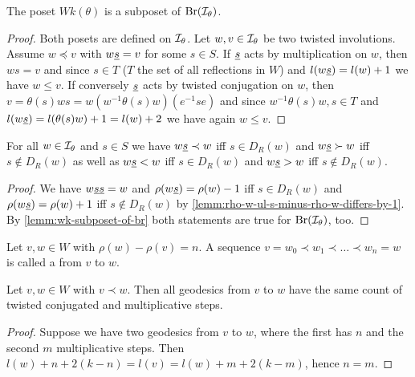 \begin{lemm}
	The poset $Wk(\theta)$ is a subposet of $\operatorname{Br}(\mathcal{I}_{\theta})$.

	\begin{proof}
		Both posets are defined on $\mathcal{I}_{\theta}$. Let $w,v \in \mathcal{I}_{\theta}$ be two twisted involutions. Assume $w \preceq v$ with $w \underline{s} = v$ for some $s \in S$. If $\underline{s}$ acts by multiplication on $w$, then $ws = v$ and since $s \in T$ ($T$ the set of all reflections in $W$) and $l(w \underline{s}) = l(w) + 1$ we have $w \leq v$. If conversely $\underline{s}$ acts by twisted conjugation on $w$, then $v = \theta(s)ws = w (w^{-1} \theta(s) w)(e^{-1}se)$ and since $w^{-1} \theta(s) w, s \in T$ and $l(w \underline{s}) = l(\theta(s)w) + 1 = l(w) + 2$ we have again $w \leq v$.
	\end{proof}
\end{lemm}

\begin{prop}
	For all $w \in \mathcal{I}_{\theta}$ and $s \in S$ we have $w \underline{s} \prec w$ iff $s \in D_R(w)$ and $w \underline{s} \succ w$ iff $s \notin D_R(w)$ as well as $w \underline{s} < w$ iff $s \in D_R(w)$ and $w \underline{s} > w$ iff $s \notin D_R(w)$.

	\begin{proof}
		We have $w \underline{s} \underline{s} = w$ and $\rho(w \underline{s}) = \rho(w) - 1$ iff $s \in D_R(w)$ and $\rho(w \underline{s}) = \rho(w) + 1$ iff $s \notin D_R(w)$ by \ref{lemm:rho-w-ul-s-minus-rho-w-differs-by-1}. By \ref{lemm:wk-subposet-of-br} both statements are true for $\operatorname{Br}(\mathcal{I}_{\theta})$, too.
	\end{proof}
\end{prop}

\begin{defi}
	Let $v,w \in W$ with $\rho(w) - \rho(v) = n$. A sequence $v = w_0 \prec w_1 \prec \ldots \prec w_n = w$ is called a  from $v$ to $w$.
\end{defi}

\begin{prop}
	Let $v,w \in W$ with $v \prec w$. Then all geodesics from $v$ to $w$ have the same count of twisted conjugated and multiplicative steps.

	\begin{proof}
		Suppose we have two geodesics from $v$ to $w$, where the first has $n$ and the second $m$ multiplicative steps. Then $l(w) + n + 2(k-n) = l(v) = l(w) + m + 2(k-m)$, hence $n = m$.
	\end{proof}
\end{prop}

